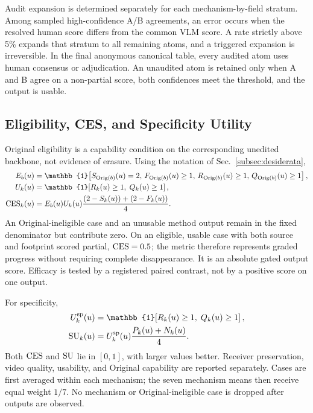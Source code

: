 Audit expansion is determined separately for each mechanism-by-field stratum.
Among sampled high-confidence A/B agreements, an error occurs when the
resolved human score differs from the common VLM score.  A rate strictly above
5\% expands that stratum to all remaining atoms, and a triggered expansion is
irreversible.  In the final anonymous canonical table, every audited atom uses
human consensus or adjudication.  An unaudited atom is retained only when A
and B agree on a non-partial score, both confidences meet the threshold, and
the output is usable.


\subsection{Eligibility, CES, and Specificity Utility}
\label{app:metric-definitions}

Original eligibility is a capability condition on the corresponding unedited
backbone, not evidence of erasure.  Using the notation of
Sec.~\ref{subsec:desiderata},
\begin{align}
  E_b(u)
  &=
  \mathbb{1}\!\left[
    S_{\operatorname{Orig}(b)}(u)=2,\,
    F_{\operatorname{Orig}(b)}(u)\geq1,\,
    R_{\operatorname{Orig}(b)}(u)\geq1,\,
    Q_{\operatorname{Orig}(b)}(u)\geq1
  \right], \\
  U_k(u)
  &=
  \mathbb{1}\!\left[R_k(u)\geq1,\;Q_k(u)\geq1\right], \\
  \ces_k(u)
  &=
  E_b(u)U_k(u)
  \frac{(2-S_k(u))+(2-F_k(u))}{4}.
  \label{eq:appendix-ces}
\end{align}
An Original-ineligible case and an unusable method output remain in the fixed
denominator but contribute zero.  On an eligible, usable case with both source
and footprint scored partial, \(\mathrm{CES}=0.5\); the metric therefore represents
graded progress without requiring complete disappearance.  It is an absolute
gated output score.  Efficacy is tested by a registered paired contrast, not
by a positive score on one output.

For specificity,
\begin{align}
  U_k^{\mathrm{sp}}(u)
  &=
  \mathbb{1}\!\left[R_k(u)\geq1,\;Q_k(u)\geq1\right], \\
  \su_k(u)
  &=
  U_k^{\mathrm{sp}}(u)
  \frac{P_k(u)+N_k(u)}{4}.
  \label{eq:appendix-su}
\end{align}
Both \(\mathrm{CES}\) and \(\mathrm{SU}\) lie in \([0,1]\), with larger values better.
Receiver preservation, video quality, usability, and Original capability are
reported separately.  Cases are first averaged within each mechanism; the
seven mechanism means then receive equal weight \(1/7\).  No mechanism or
Original-ineligible case is dropped after outputs are observed.


